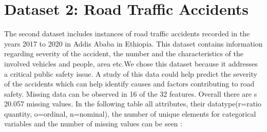 \documentclass{article}
\begin{document}
\vspace{-20pt}
\section{Dataset 2: Road Traffic Accidents}
\vspace{-8pt}
The second dataset includes instances of road traffic accidents recorded in the years 2017 to 2020 in Addis Ababa in Ethiopia. This dataset contains information regarding severity of the accident, the number and the characteristics of the involved vehicles and  people, area etc.We chose this dataset because it addresses a critical public safety issue. A study of this data could help predict the severity of the accidents which can help identify causes and factors contributing to road safety. \newline
Missing data can be observed in 16 of the 32 features. Overall there are s 20.057 missing values. In the following table all attributes, their datatype(r=ratio quantity, o=ordinal, n=nominal), the number of unique elements for categorical variables and the number of missing values can be seen :
\end{document}
